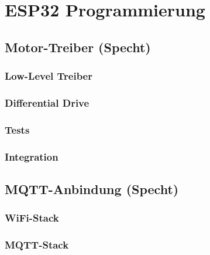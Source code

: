 \chapter{ESP32 Programmierung}

\section{Motor-Treiber (Specht)}

\subsection{Low-Level Treiber}

\subsection{Differential Drive}

\subsection{Tests}

\subsection{Integration}

\section{MQTT-Anbindung (Specht)}

\subsection{WiFi-Stack}

\subsection{MQTT-Stack}

